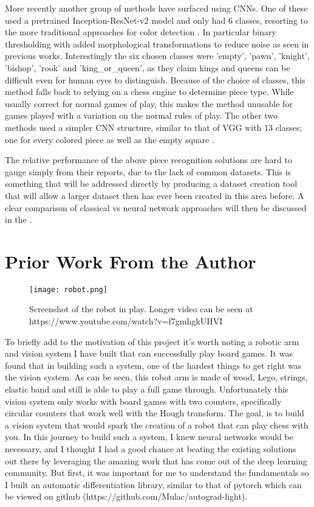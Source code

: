More recently another group of methods have surfaced using CNNs.
One of these used a pretrained Inception-ResNet-v2 model and only had 6 classes, resorting to the more traditional approaches for color detection \cite{6classes}.
In particular binary thresholding with added morphological transformations to reduce noise as seen in previous works.
Interestingly the six chosen classes were 'empty', 'pawn', 'knight', 'bishop', 'rook' and 'king\_or\_queen', as they claim kings and queens can be
difficult even for human eyes to distinguish.  Because of the choice of classes, this method falls back to relying on a chess engine to determine piece type.
While usually correct for normal games of play, this makes the method unusable for games played with a variation on the normal rules of play.
The other two methods used a simpler CNN structure, similar to that of VGG with 13 classes; one for every colored piece as well as the empty square \cite{chessvgg, alexnetchess}.

The relative performance of the above piece recognition solutions are hard to gauge simply from their reports, due to the lack of common datasets.  
This is something that will be addressed directly by producing a dataset creation tool that will allow a larger dataset then has ever been created in this 
area before.  
A clear comparison of classical vs neural network approaches will then be discussed in the .

\section{Prior Work From the Author}

\begin{figure}[h]
    \centering
    \texttt{[image: robot.png]}
    \caption{Screenshot of the robot in play.  Longer video can be seen at https://www.youtube.com/watch?v=f7gmhgkUHVI}
\label{fig:robot}
\end{figure}

To briefly add to the motivation of this project it's worth noting a robotic arm and vision system I have built that can successfully play board games.
It was found that in building such a system, one of the hardest things to get right was the vision system.  As can be seen, this robot arm is 
made of wood, Lego, strings, elastic band and still is able to play a full game through.
Unfortunately this vision system only works with board games with two counters, specifically circular counters that work well with the 
Hough transform.  
The goal, is to build a vision system that would spark the creation of a robot that can play chess with you.
In this journey to build such a system, I knew neural networks would be necessary, and I thought I had a good chance at beating the existing solutions
out there by leveraging the amazing work that has come out of the deep learning community.
But first, it was important for me to understand the fundamentals so I built an automatic differentiation library, similar to that of pytorch which can be
viewed on github (https://github.com/Mulac/autograd-light).
